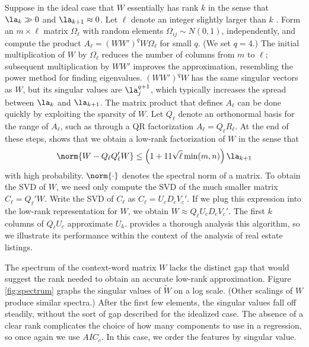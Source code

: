 \documentclass[12pt]{article}
\begin{document}
 
 Suppose in the ideal case that $W$ essentially has rank $k$ in the sense that $\la_k \gg 0$ and $\la_{k+1} \approx 0$.  Let $\ell$
 denote an integer slightly larger than $k$ \citep[see][for the
 details]{tropp10}.   Form an $m \times \ell$ matrix $\Omega_{\ell}$ with random
 elements $\Omega_{ij} \sim N(0,1)$, independently, and compute the product
 $A_{\ell} = (W W')^q W \Omega_{\ell}$ for small $q$.  (We set $q = 4$.)  The initial multiplication of $W$ by $\Omega_\ell$ reduces the number of columns
 from $m$ to $\ell$;  subsequent multiplication by $W W'$ improves the
 approximation, resembling the power method for finding eigenvalues. $(W W')^q W$ has the same singular vectors as $W$, but its singular values are $\la_j^{q+1}$, which typically increases the spread between $\la_k$ and $\la_{k+1}$.   The matrix product that defines $A_\ell$ can be done quickly by exploiting
 the sparsity of $W$.  Let $Q_{\ell}$ denote an orthonormal basis for the range of $A_{\ell}$, such as through a QR factorization $A_\ell = Q_\ell R_\ell$.  At the end of these steps, \citet{tropp10} shows that we obtain a low-rank factorization of $W$ in the sense that 
 \begin{equation}
   \norm{W - Q_{\ell} Q_\ell' W} \le  \left(1+11 \sqrt{\ell} \min(m,n)\right) \la_{k+1}
\label{tropp}
 \end{equation}
 with high probability.  $\norm{\cdot}$ denotes the spectral norm of a matrix.
 To obtain the SVD of $W$, we need only compute the SVD of the much smaller matrix $C_\ell = Q_\ell'W$.  Write the SVD of $C_\ell$ as $C_\ell = U_c D_c V_c'$.  If we plug this expression into the low-rank representation for $W$, we obtain $W \approx Q_\ell U_c D_c V_c'$. The first $k$ columns of $Q_\ell U_c$ approximate  $U_k$.  \citet{tropp10}
 provides a thorough analysis this algorithm, so we
 illustrate its performance within the context of the analysis of real estate listings.


 The spectrum of the context-word matrix $W$ lacks the distinct gap that would suggest the rank needed to obtain an accurate low-rank approximation.  Figure \ref{fig:spectrum} graphs the singular values of $\tilde{W}$ on a log scale. (Other scalings of $W$ produce similar spectra.)  After the first few elements, the singular values fall off steadily, without the sort of gap described for the idealized case.  The absence of a clear rank complicates the choice of how many components to use in a regression, so once again we use $AIC_c$.  In this case, we order the features by singular value.
\end{document}
